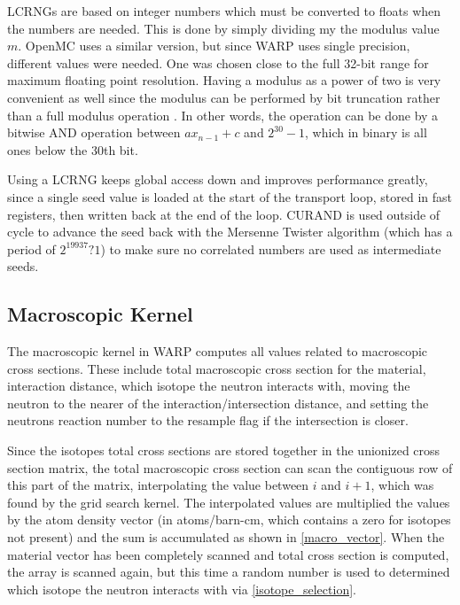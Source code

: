 LCRNGs are based on integer numbers which must be converted to floats when the numbers are needed.  This is done by simply dividing my the modulus value $m$.  OpenMC uses a similar version, but since WARP uses single precision, different values were needed.   One was chosen close to the full 32-bit range for maximum floating point resolution.  Having a modulus as a power of two is very convenient as well since the modulus can be performed by bit truncation rather than a full modulus operation \cite{openmc}.  In other words, the operation can be done by a bitwise AND operation between $a x_{n-1} + c$ and $2^{30}-1$, which in binary is all ones below the 30th bit.

Using a LCRNG keeps global access down and improves performance greatly, since a single seed value is loaded at the start of the transport loop, stored in fast registers, then written back at the end of the loop.  CURAND is used outside of cycle to advance the seed back with the Mersenne Twister algorithm (which has a period of $2^{19937} ? 1$) to make sure no correlated numbers are used as intermediate seeds.

\subsection{Macroscopic Kernel}

The macroscopic kernel in WARP computes all values related to macroscopic cross sections.  These include total macroscopic cross section for the material, interaction distance, which isotope the neutron interacts with, moving the neutron to the nearer of the interaction/intersection distance, and setting the neutrons reaction number to the resample flag if the intersection is closer.  

Since the isotopes total cross sections are stored together in the unionized cross section matrix, the total macroscopic cross section can scan the contiguous row of this part of the matrix, interpolating the value between $i$ and $i+1$, which was found by the grid search kernel.  The interpolated values are multiplied the values by the atom density vector (in atoms/barn-cm, which contains a zero for isotopes not present) and the sum is accumulated as shown in \eqref{macro_vector}.  When the material vector has been completely scanned and total cross section is computed, the array is scanned again, but this time a random number is used to determined which isotope the neutron interacts with via \eqref{isotope_selection}.

